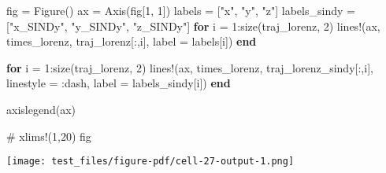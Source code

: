 \documentclass[
]{article}
\newenvironment{Shaded}{\begin{snugshade}}{\end{snugshade}}
\newcommand{\CommentTok}[1]{\textcolor[rgb]{0.37,0.37,0.37}{#1}}
\newcommand{\ControlFlowTok}[1]{\textcolor[rgb]{0.00,0.23,0.31}{\textbf{#1}}}
\newcommand{\FloatTok}[1]{\textcolor[rgb]{0.68,0.00,0.00}{#1}}
\newcommand{\FunctionTok}[1]{\textcolor[rgb]{0.28,0.35,0.67}{#1}}
\newcommand{\NormalTok}[1]{\textcolor[rgb]{0.00,0.23,0.31}{#1}}
\newcommand{\OperatorTok}[1]{\textcolor[rgb]{0.37,0.37,0.37}{#1}}
\newcommand{\StringTok}[1]{\textcolor[rgb]{0.13,0.47,0.30}{#1}}
\begin{document}
\begin{Shaded}
\begin{Highlighting}[]
\NormalTok{fig }\OperatorTok{=} \FunctionTok{Figure}\NormalTok{()}
\NormalTok{ax }\OperatorTok{=} \FunctionTok{Axis}\NormalTok{(fig[}\FloatTok{1}\NormalTok{, }\FloatTok{1}\NormalTok{])}
\NormalTok{labels }\OperatorTok{=}\NormalTok{ [}\StringTok{"x"}\NormalTok{, }\StringTok{"y"}\NormalTok{, }\StringTok{"z"}\NormalTok{]}
\NormalTok{labels\_sindy }\OperatorTok{=}\NormalTok{ [}\StringTok{"x\_SINDy"}\NormalTok{, }\StringTok{"y\_SINDy"}\NormalTok{, }\StringTok{"z\_SINDy"}\NormalTok{]}
\ControlFlowTok{for}\NormalTok{ i }\OperatorTok{=} \FloatTok{1}\OperatorTok{:}\FunctionTok{size}\NormalTok{(traj\_lorenz, }\FloatTok{2}\NormalTok{)}
  \FunctionTok{lines!}\NormalTok{(ax, times\_lorenz, traj\_lorenz[}\OperatorTok{:}\NormalTok{,i], label }\OperatorTok{=}\NormalTok{ labels[i])}
\ControlFlowTok{end}

\ControlFlowTok{for}\NormalTok{ i }\OperatorTok{=} \FloatTok{1}\OperatorTok{:}\FunctionTok{size}\NormalTok{(traj\_lorenz, }\FloatTok{2}\NormalTok{)}
  \FunctionTok{lines!}\NormalTok{(ax, times\_lorenz, traj\_lorenz\_sindy[}\OperatorTok{:}\NormalTok{,i], linestyle }\OperatorTok{=} \OperatorTok{:}\NormalTok{dash, label }\OperatorTok{=}\NormalTok{ labels\_sindy[i])}
\ControlFlowTok{end}

\FunctionTok{axislegend}\NormalTok{(ax)}

\CommentTok{\# xlims!(1,20)}
\NormalTok{fig}
\end{Highlighting}
\end{Shaded}

\texttt{[image: test\_files/figure-pdf/cell-27-output-1.png]}
\end{document}
